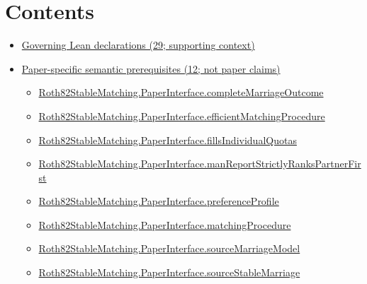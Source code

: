 \documentclass[10pt]{article}
\begin{document}
\section*{Contents}
\begin{itemize}[leftmargin=1.2em]
\item \hyperlink{governing-declaration-section-5ef5ef0364b6939c}{Governing Lean declarations (29; supporting context)}
\item \hyperlink{paper-prerequisite-section-5ef5ef0364b6939c}{Paper-specific semantic prerequisites (12; not paper claims)}
\begin{itemize}[leftmargin=1.2em]
\item \hyperlink{paper-prerequisite-efa58a68b1c17a47}{Roth82\allowbreak{}Stable\allowbreak{}Matching.\allowbreak{}Paper\allowbreak{}Interface.\allowbreak{}complete\allowbreak{}Marriage\allowbreak{}Outcome}
\item \hyperlink{paper-prerequisite-959836477d3894e7}{Roth82\allowbreak{}Stable\allowbreak{}Matching.\allowbreak{}Paper\allowbreak{}Interface.\allowbreak{}efficient\allowbreak{}Matching\allowbreak{}Procedure}
\item \hyperlink{paper-prerequisite-4a6f1f4c2cc31f96}{Roth82\allowbreak{}Stable\allowbreak{}Matching.\allowbreak{}Paper\allowbreak{}Interface.\allowbreak{}fills\allowbreak{}Individual\allowbreak{}Quotas}
\item \hyperlink{paper-prerequisite-bcdb1d603a6bc29f}{Roth82\allowbreak{}Stable\allowbreak{}Matching.\allowbreak{}Paper\allowbreak{}Interface.\allowbreak{}man\allowbreak{}Report\allowbreak{}Strictly\allowbreak{}Ranks\allowbreak{}Partner\allowbreak{}First}
\item \hyperlink{paper-prerequisite-4ea46caa97f4cf98}{Roth82\allowbreak{}Stable\allowbreak{}Matching.\allowbreak{}Paper\allowbreak{}Interface.\allowbreak{}preference\allowbreak{}Profile}
\item \hyperlink{paper-prerequisite-0c127f79bf5ff5ac}{Roth82\allowbreak{}Stable\allowbreak{}Matching.\allowbreak{}Paper\allowbreak{}Interface.\allowbreak{}matching\allowbreak{}Procedure}
\item \hyperlink{paper-prerequisite-3f648194f6cc68b8}{Roth82\allowbreak{}Stable\allowbreak{}Matching.\allowbreak{}Paper\allowbreak{}Interface.\allowbreak{}source\allowbreak{}Marriage\allowbreak{}Model}
\item \hyperlink{paper-prerequisite-42fca1f7c299639c}{Roth82\allowbreak{}Stable\allowbreak{}Matching.\allowbreak{}Paper\allowbreak{}Interface.\allowbreak{}source\allowbreak{}Stable\allowbreak{}Marriage}

\end{itemize}
\end{itemize}
\end{document}
